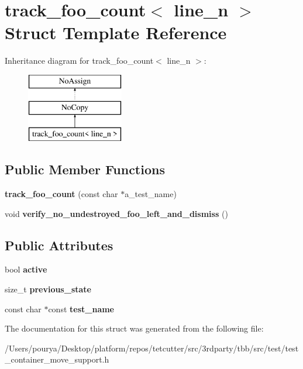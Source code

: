 \hypertarget{structtrack__foo__count}{}\section{track\+\_\+foo\+\_\+count$<$ line\+\_\+n $>$ Struct Template Reference}
\label{structtrack__foo__count}
Inheritance diagram for track\+\_\+foo\+\_\+count$<$ line\+\_\+n $>$\+:\begin{figure}[H]
\begin{center}
\leavevmode
\includegraphics[height=3.000000cm]{structtrack__foo__count}
\end{center}
\end{figure}
\subsection*{Public Member Functions}
\begin{DoxyCompactItemize}
\item 
\hypertarget{structtrack__foo__count_a3ceec1e913fd76ae6da8a1ed197aacba}{}{\bfseries track\+\_\+foo\+\_\+count} (const char $\ast$a\+\_\+test\+\_\+name)\label{structtrack__foo__count_a3ceec1e913fd76ae6da8a1ed197aacba}

\item 
\hypertarget{structtrack__foo__count_ab1411767cc86657985ef9e4513ba060d}{}void {\bfseries verify\+\_\+no\+\_\+undestroyed\+\_\+foo\+\_\+left\+\_\+and\+\_\+dismiss} ()\label{structtrack__foo__count_ab1411767cc86657985ef9e4513ba060d}

\end{DoxyCompactItemize}
\subsection*{Public Attributes}
\begin{DoxyCompactItemize}
\item 
\hypertarget{structtrack__foo__count_ae4c629aacb39c4e5b9e7d536cb4aedd0}{}bool {\bfseries active}\label{structtrack__foo__count_ae4c629aacb39c4e5b9e7d536cb4aedd0}

\item 
\hypertarget{structtrack__foo__count_a25acafd2a249582661c1471e026cead6}{}size\+\_\+t {\bfseries previous\+\_\+state}\label{structtrack__foo__count_a25acafd2a249582661c1471e026cead6}

\item 
\hypertarget{structtrack__foo__count_a55f68574981ddd219e83967dcf699e96}{}const char $\ast$const {\bfseries test\+\_\+name}\label{structtrack__foo__count_a55f68574981ddd219e83967dcf699e96}

\end{DoxyCompactItemize}


The documentation for this struct was generated from the following file\+:\begin{DoxyCompactItemize}
\item 
/\+Users/pourya/\+Desktop/platform/repos/tetcutter/src/3rdparty/tbb/src/test/test\+\_\+container\+\_\+move\+\_\+support.\+h\end{DoxyCompactItemize}
